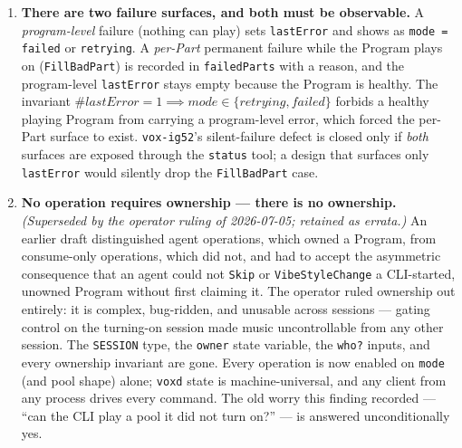 \documentclass[a4paper,10pt,fleqn]{article}
\begin{document}
\begin{enumerate}
  \item \textbf{There are two failure surfaces, and both must be observable.}
    A \emph{program-level} failure (nothing can play) sets \texttt{lastError}
    and shows as \texttt{mode = failed} or \texttt{retrying}. A \emph{per-Part}
    permanent failure while the Program plays on (\texttt{FillBadPart}) is
    recorded in \texttt{failedParts} with a reason, and the program-level
    \texttt{lastError} stays empty because the Program is healthy. The
    invariant $\# lastError = 1 \implies mode \in \{retrying, failed\}$ forbids a
    healthy playing Program from carrying a program-level error, which forced
    the per-Part surface to exist. \texttt{vox-ig52}'s silent-failure defect is
    closed only if \emph{both} surfaces are exposed through the \texttt{status}
    tool; a design that surfaces only \texttt{lastError} would silently drop the
    \texttt{FillBadPart} case.

  \item \textbf{No operation requires ownership --- there is no ownership.}
    \emph{(Superseded by the operator ruling of 2026-07-05; retained as errata.)}
    An earlier draft distinguished agent operations, which owned a Program, from
    consume-only operations, which did not, and had to accept the asymmetric
    consequence that an agent could not \texttt{Skip} or \texttt{VibeStyleChange}
    a CLI-started, unowned Program without first claiming it. The operator ruled
    ownership out entirely: it is complex, bug-ridden, and unusable across
    sessions --- gating control on the turning-on session made music
    uncontrollable from any other session. The \texttt{SESSION} type, the
    \texttt{owner} state variable, the \texttt{who?} inputs, and every ownership
    invariant are gone. Every operation is now enabled on \texttt{mode} (and
    pool shape) alone; \texttt{voxd} state is machine-universal, and any client
    from any process drives every command. The old worry this finding recorded
    --- ``can the CLI play a pool it did not turn on?'' --- is answered
    unconditionally yes.


\end{enumerate}
\end{document}
